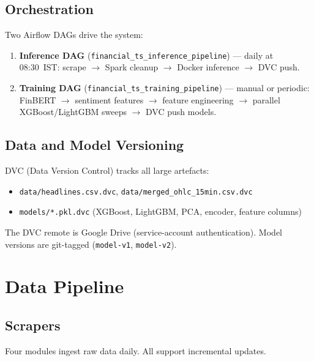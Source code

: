 \documentclass[11pt,a4paper]{article}
\begin{document}
\subsection{Orchestration}

Two Airflow DAGs drive the system:

\begin{enumerate}[nosep]
  \item \textbf{Inference DAG} (\texttt{financial\_ts\_inference\_pipeline}) —
        daily at 08:30~IST: scrape $\to$ Spark cleanup $\to$ Docker inference
        $\to$ DVC push.
  \item \textbf{Training DAG} (\texttt{financial\_ts\_training\_pipeline}) —
        manual or periodic: FinBERT $\to$ sentiment features $\to$ feature
        engineering $\to$ parallel XGBoost/LightGBM sweeps $\to$ DVC push models.
\end{enumerate}

\subsection{Data and Model Versioning}

DVC (Data Version Control) tracks all large artefacts:
\begin{itemize}[nosep]
  \item \texttt{data/headlines.csv.dvc}, \texttt{data/merged\_ohlc\_15min.csv.dvc}
  \item \texttt{models/*.pkl.dvc} (XGBoost, LightGBM, PCA, encoder, feature columns)
\end{itemize}
The DVC remote is Google Drive (service-account authentication).
Model versions are git-tagged (\texttt{model-v1}, \texttt{model-v2}).


\section{Data Pipeline}
\label{sec:data-pipeline}

\subsection{Scrapers}

Four modules ingest raw data daily. All support incremental updates.
\end{document}
